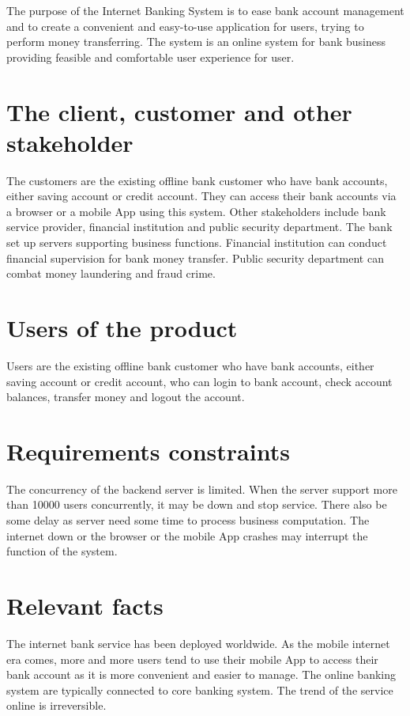 \documentclass{scrreprt}
\begin{document}
The purpose of the Internet Banking System is to ease bank account management and to create a convenient and easy-to-use application for users, trying to perform money transferring. The system is an online system for bank business providing feasible and comfortable user experience for user.

\section{The client, customer and other stakeholder}
The customers are the existing offline bank customer who have bank accounts, either saving account or credit account. They can access their bank accounts via a browser or a mobile App using this system. Other stakeholders include bank service provider, financial institution and public security department. The bank set up servers supporting business functions. Financial institution can conduct financial supervision for bank money transfer. Public security department can combat money laundering and fraud crime.

\section{Users of the product}
Users are the existing offline bank customer who have bank accounts, either saving account or credit account, who can login to bank account, check account balances, transfer money and logout the account.


\section{Requirements constraints}
The concurrency of the backend server is limited. When the server support more than 10000 users concurrently, it may be down and stop service.
There also be some delay as server need some time to process business computation. The internet down or the browser or the mobile App crashes may interrupt the function of the system.



\section{Relevant facts}
The internet bank service has been deployed worldwide. As the mobile internet era comes, more and more users tend to use their mobile App to access their bank account as it is more convenient and easier to manage. The online banking system are typically connected to core banking system. The trend of the service online is irreversible.
\end{document}
